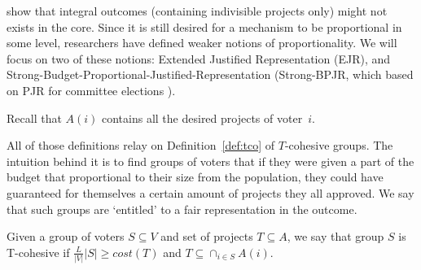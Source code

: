 \documentclass[runningheads]{llncs}
\newcommand{\kibitz}[2]{\ifnum\Comments=1{\color{#1}{#2}}\fi}
\newcommand{\rf}[1]{\kibitz{blue}{[Roy says:#1]}}
\begin{document}


\citet{fain2018fair} show that integral outcomes (containing indivisible projects only) might not exists in the core.
Since it is still desired for a mechanism to be proportional in some level, researchers have   defined  weaker notions of proportionality. We will focus on two of these notions: Extended Justified Representation (EJR)\cite{peters2020proportional}, and Strong-Budget-Proportional-Justified-Representation \cite{aziz2017proportionally} (Strong-BPJR, which based on PJR for committee elections \cite{aziz2017justified,sanchez2017proportional}).%

Recall that $A(i)$ contains all the desired projects of voter~$i$.


All of those definitions relay on Definition~\ref{def:tco} of $T$-cohesive groups. The intuition behind it is to find groups of voters that if they were given a part of the budget that proportional to their size from the population, they could have guaranteed for themselves a certain amount of projects they all approved. We say that such groups are `entitled' to a fair representation in the outcome.


\begin{definition}\label{def:tco} Given a group of voters $S\subseteq V$ and set of projects $T\subseteq A$, we say that group $S$ is T-cohesive if $\frac{L}{|V|}|S|\geq cost(T)$ and $T\subseteq \cap_{i\in S}A(i)$.
\end{definition}
\end{document}
